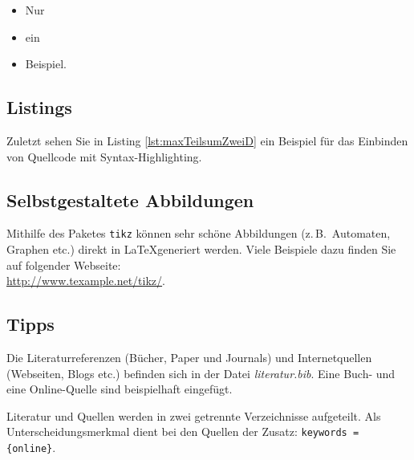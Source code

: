 \documentclass[12pt,a4paper,bibliography=totocnumbered,listof=totocnumbered]{scrartcl}
\begin{document}
\begin{itemize}
	\item Nur
	\item ein
	\item Beispiel.
\end{itemize}

\subsection{Listings}
Zuletzt sehen Sie in Listing \ref{lst:maxTeilsumZweiD} ein Beispiel für das Einbinden von Quellcode mit Syntax-Highlighting.

\vspace{1em}


\subsection{Selbstgestaltete Abbildungen}
Mithilfe des Paketes \texttt{tikz} können sehr schöne Abbildungen (z.\,B.\ Automaten, Graphen etc.) direkt in \LaTeX generiert werden. Viele Beispiele dazu finden Sie auf folgender Webseite:\\[1em]
\hspace*{3cm}\url{http://www.texample.net/tikz/}.

\subsection{Tipps}
Die Literaturreferenzen (Bücher, Paper und Journals) und Internetquellen (Webseiten, Blogs etc.) befinden sich in der Datei \textit{literatur.bib}. Eine Buch- und eine Online-Quelle sind beispielhaft eingefügt.  %

Literatur und Quellen werden in zwei getrennte Verzeichnisse aufgeteilt. Als Unterscheidungsmerkmal dient bei den Quellen der Zusatz: \texttt{keywords = \{online\}}.

\pagebreak


  
\end{document}
